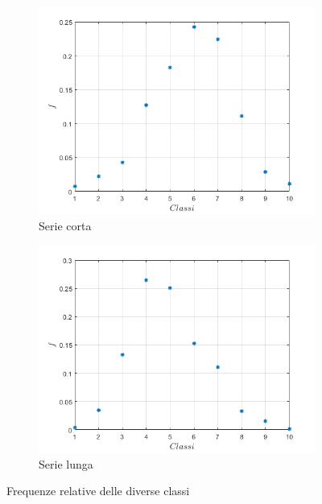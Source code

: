 \begin{figure}
	
	\begin{subfigure}{0.5\textwidth}
		\centering
		\includegraphics[width=\linewidth]{chapters/1-misureT/relshort}
		\caption{Serie corta}
		\label{fig:relshort}
	\end{subfigure}%
	\begin{subfigure}{0.5\textwidth}
		\centering
		\includegraphics[width=\linewidth]{chapters/1-misureT/rellong}
		\caption{Serie lunga}
		\label{fig:rellong}
	\end{subfigure}
	\caption{Frequenze relative delle diverse classi}
	\label{fig:relboth}
\end{figure}

